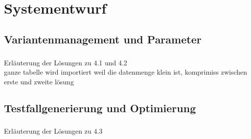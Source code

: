 \chapter{Systementwurf}\label{chp:systementwurf}


\section{Variantenmanagement und Parameter}
\paragraph{}
Erläuterung der Lösungen zu 4.1 und 4.2\\

ganze tabelle wird importiert weil die datenmenge klein ist, komprimiss zwischen erste und zweite lösung\\

\newpage
\section{Testfallgenerierung und Optimierung}
\paragraph{}
Erläuterung der Lösungen zu 4.3